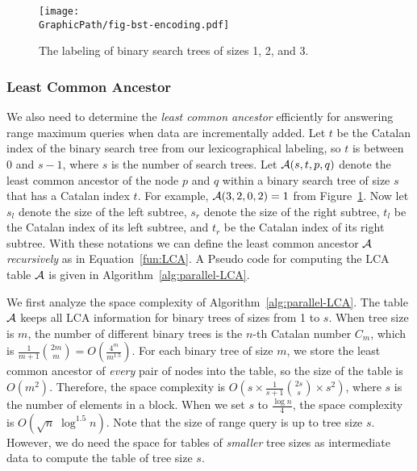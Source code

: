 \begin{figure}[!thb]
  \centering
  \texttt{[image: \\GraphicPath/fig-bst-encoding.pdf]}
  \caption{The labeling of binary search trees of sizes 1, 2, and 3.}
  \label{fig:labelingBST}
\end{figure}

\subsubsection{Least Common Ancestor}

We also need to determine the {\em least common ancestor} efficiently
for answering range maximum queries when data are incrementally added.
Let $t$ be the Catalan index of the binary search tree from our
lexicographical labeling, so $t$ is between 0 and $s - 1$, where $s$
is the number of search trees.  Let ${\cal A}(s, t, p, q)$ denote the
least common ancestor of the node $p$ and $q$ within a binary search
tree of size $s$ that has a Catalan index $t$.  For example, ${\cal
  A}(3, 2, 0, 2) = 1$ from Figure~\ref{fig:labelingBST}.  Now let
$s_l$ denote the size of the left subtree, $s_r$ denote the size of
the right subtree, $t_l$ be the Catalan index of its left subtree, and
$t_r$ be the Catalan index of its right subtree.  With these notations
we can define the least common ancestor $\cal A$ {\em recursively} as
in Equation~\ref{fun:LCA}.  A Pseudo code for computing the LCA table
$\cal A$ is given in Algorithm~\ref{alg:parallel-LCA}.





We first analyze the space complexity of
Algorithm~\ref{alg:parallel-LCA}.  The table $\cal A$ keeps all LCA
information for binary trees of sizes from 1 to $s$.  When tree size
is $m$, the number of different binary trees is the $n$-th Catalan
number $C_m$, which is $\frac{1}{m+1}\binom{2m}{m} =
O(\frac{4^m}{m^{1.5}})$.  For each binary tree of size $m$, we store
the least common ancestor of {\em every} pair of nodes into the table,
so the size of the table is $O(m^2)$.  Therefore, the space complexity
is $O(s \times \frac{1}{s+1}\binom{2s}{s} \times s^2)$, where $s$ is
the number of elements in a block.  When we set $s$ to $\frac{\log
  n}{4}$, the space complexity is $O(\sqrt{n} \; \log ^{1.5} n)$.  Note
that the size of range query is up to tree size $s$.  However, we do
need the space for tables of {\em smaller} tree sizes as intermediate
data to compute the table of tree size $s$.


